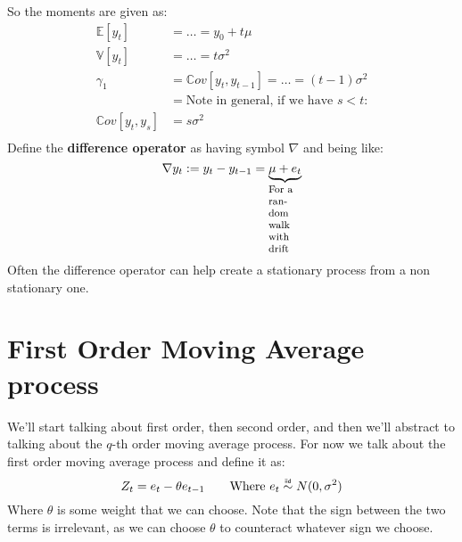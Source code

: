 So the moments are given as:
\begin{equation*}
    \begin{aligned}
        \mathbb{E}[y_t] &= \dots = y_0 + t\mu  \\
        \mathbb{V}[y_t] &= \dots = t\sigma^2\\
        \gamma_1 &= \mathbb{C}ov[y_t, y_{t-1}] = \dots = (t-1) \sigma^2 \\
                 &= \text{Note in general, if we have $s < t$:} \\
        \mathbb{C}ov[y_t, y_s] &= s \sigma^2 \\
    \end{aligned}
\end{equation*}
Define the \textbf{difference operator} as having symbol $\nabla$ and being
like:
\begin{equation*}
    \nabla y_t := y_t - y_{t-1} = \explain{\mu + e_t}{For a random walk with
    drift}
\end{equation*}
Often the difference operator can help create a stationary process from a non
stationary one.

\section{First Order Moving Average process}
We'll start talking about first order, then second order, and then we'll
abstract to talking about the $q$-th order moving average process. For now we
talk about the first order moving average process and define it as:
\begin{equation*}
    Z_t = e_t - \theta e_{t-1} \qquad \text{Where $e_t \iid N(0, \sigma^2)$}
\end{equation*}
Where $\theta$ is some weight that we can choose. Note that the sign between
the two terms is irrelevant, as we can choose $\theta$ to counteract whatever
sign we choose.


